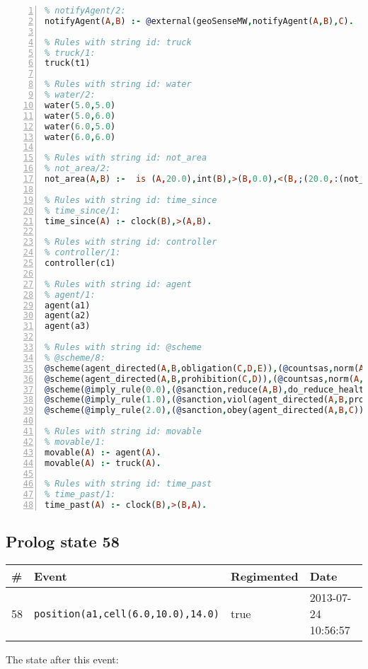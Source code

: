 \documentclass[11pt]{article}\usepackage[utf8]{inputenc}\usepackage{geometry}
\begin{document}
\begin{lstlisting}[language=Prolog, numbers=left]
% Rules with string id: notifyAgent
% notifyAgent/2:
notifyAgent(A,B) :- @external(geoSenseMW,notifyAgent(A,B),C).

% Rules with string id: truck
% truck/1:
truck(t1)

% Rules with string id: water
% water/2:
water(5.0,5.0)
water(5.0,6.0)
water(6.0,5.0)
water(6.0,6.0)

% Rules with string id: not_area
% not_area/2:
not_area(A,B) :-  is (A,20.0),int(B),>(B,0.0),<(B,;(20.0,:(not_area(A,B), is (-(B),20.0)))),int(A),>(A,0.0),<(A,;(20.0,:(area(A,B),-(int(A))))),int(B),>(A,0.0),>(B,0.0),<(A,21.0),<(B,21.0).

% Rules with string id: time_since
% time_since/1:
time_since(A) :- clock(B),>(A,B).

% Rules with string id: controller
% controller/1:
controller(c1)

% Rules with string id: agent
% agent/1:
agent(a1)
agent(a2)
agent(a3)

% Rules with string id: @scheme
% @scheme/8:
@scheme(agent_directed(A,B,obligation(C,D,E)),(@countsas,norm(A,B,F,obligation(C,D,E)),F),false,(listTrue(C)),(time_past(D)),false,[plus(viol(agent_directed(A,B,obligation(C,D,E))))|[]],[plus(obey(agent_directed(A,B,obligation(C,D,E))))|[]])
@scheme(agent_directed(A,B,prohibition(C,D)),(@countsas,norm(A,B,E,prohibition(C,D)),E),(listTrue(C)),false,(false),false,[plus(viol(agent_directed(A,B,prohibition(C,D))))|[]],[plus(obey(agent_directed(A,B,prohibition(C,D))))|[]])
@scheme(@imply_rule(0.0),(@sanction,reduce(A,B),do_reduce_health(A,B),notifyAgent(A,changed(status))),true,false,false,false,[min(reduce(A,B))|[]],[])
@scheme(@imply_rule(1.0),(@sanction,viol(agent_directed(A,B,prohibition(C,D))),do_sanction(D)),true,false,false,false,[min(viol(agent_directed(A,B,prohibition(C,D))))|[]],[])
@scheme(@imply_rule(2.0),(@sanction,obey(agent_directed(A,B,C))),true,false,false,false,[min(obey(agent_directed(A,B,C)))|[]],[])

% Rules with string id: movable
% movable/1:
movable(A) :- agent(A).
movable(A) :- truck(A).

% Rules with string id: time_past
% time_past/1:
time_past(A) :- clock(B),>(B,A).

\end{lstlisting}
\clearpage 
\subsection{Prolog state 58}
\begin{table}[ht]
\centering 
\begin{tabular}{l l l l} 
\textbf{\#} & \textbf{Event} & \textbf{Regimented} & \textbf{Date} \\ [0.5ex] 
\hline
58&\texttt{position(a1,cell(6.0,10.0),14.0)}&true&2013-07-24 10:56:57\\ [1ex] \hline\end{tabular}
\end{table}
The state after this event:
\end{document}
